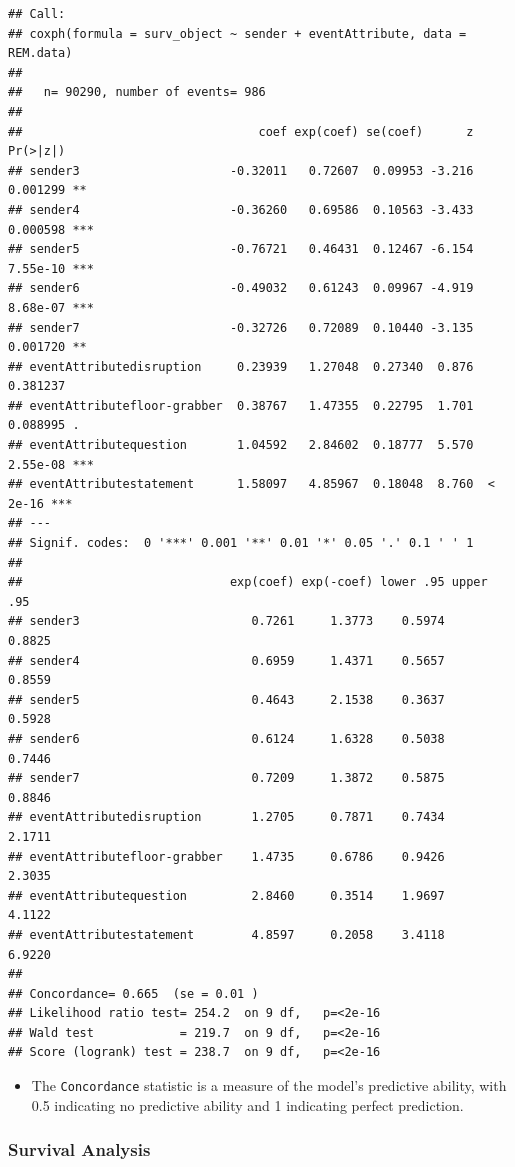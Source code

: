 \documentclass[
]{article}
\providecommand{\tightlist}{%
  \setlength{\itemsep}{0pt}\setlength{\parskip}{0pt}}
\begin{document}
\begin{verbatim}
## Call:
## coxph(formula = surv_object ~ sender + eventAttribute, data = REM.data)
## 
##   n= 90290, number of events= 986 
## 
##                                 coef exp(coef) se(coef)      z Pr(>|z|)    
## sender3                     -0.32011   0.72607  0.09953 -3.216 0.001299 ** 
## sender4                     -0.36260   0.69586  0.10563 -3.433 0.000598 ***
## sender5                     -0.76721   0.46431  0.12467 -6.154 7.55e-10 ***
## sender6                     -0.49032   0.61243  0.09967 -4.919 8.68e-07 ***
## sender7                     -0.32726   0.72089  0.10440 -3.135 0.001720 ** 
## eventAttributedisruption     0.23939   1.27048  0.27340  0.876 0.381237    
## eventAttributefloor-grabber  0.38767   1.47355  0.22795  1.701 0.088995 .  
## eventAttributequestion       1.04592   2.84602  0.18777  5.570 2.55e-08 ***
## eventAttributestatement      1.58097   4.85967  0.18048  8.760  < 2e-16 ***
## ---
## Signif. codes:  0 '***' 0.001 '**' 0.01 '*' 0.05 '.' 0.1 ' ' 1
## 
##                             exp(coef) exp(-coef) lower .95 upper .95
## sender3                        0.7261     1.3773    0.5974    0.8825
## sender4                        0.6959     1.4371    0.5657    0.8559
## sender5                        0.4643     2.1538    0.3637    0.5928
## sender6                        0.6124     1.6328    0.5038    0.7446
## sender7                        0.7209     1.3872    0.5875    0.8846
## eventAttributedisruption       1.2705     0.7871    0.7434    2.1711
## eventAttributefloor-grabber    1.4735     0.6786    0.9426    2.3035
## eventAttributequestion         2.8460     0.3514    1.9697    4.1122
## eventAttributestatement        4.8597     0.2058    3.4118    6.9220
## 
## Concordance= 0.665  (se = 0.01 )
## Likelihood ratio test= 254.2  on 9 df,   p=<2e-16
## Wald test            = 219.7  on 9 df,   p=<2e-16
## Score (logrank) test = 238.7  on 9 df,   p=<2e-16
\end{verbatim}

\begin{itemize}
\tightlist
\item
  The \texttt{Concordance} statistic is a measure of the model's
  predictive ability, with 0.5 indicating no predictive ability and 1
  indicating perfect prediction.
\end{itemize}

\hypertarget{survival-analysis}{%
\subsubsection{Survival Analysis}\label{survival-analysis}}
\end{document}
